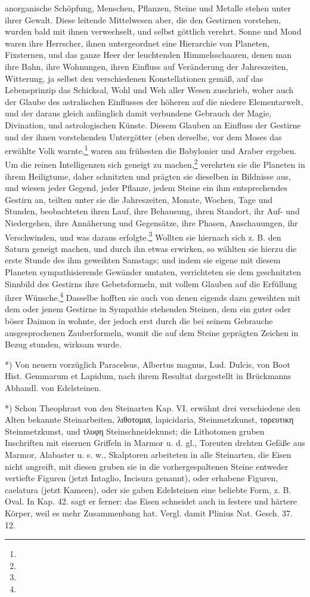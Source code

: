 \documentclass[a4paper, 11pt, oneside, polutonikogreek, german]{article}
\begin{document}
anorganische Schöpfung, Menschen, Pflanzen, Steine und Metalle stehen unter ihrer Gewalt. Diese leitende Mittelwesen aber, die den Gestirnen vorstehen, wurden bald mit ihnen verwechselt, und selbst göttlich verehrt. Sonne und Mond waren ihre Herrscher, ihnen untergeordnet eine Hierarchie von Planeten, Fixsternen, und das ganze Heer der leuchtenden Himmelsschaaren, denen man ihre Bahn, ihre Wohnungen, ihren Einfluss auf Veränderung der Jahreszeiten, Witterung, ja selbst den verschiedenen Konstellationen gemäß, auf das Lebensprinzip das Schicksal, Wohl und Weh aller Wesen zuschrieb, woher auch der Glaube des astralischen Einflusses der höheren auf die niedere Elementarwelt, und der daraus gleich anfänglich damit verbundene Gebrauch der Magie, Divination, und astrologischen Künste. Diesem Glauben an Einfluss der Gestirne und der ihnen vorstehenden Untergötter (eben derselbe, vor dem Moses das erwählte Volk warnte,\footnote{} waren am frühesten die Babylonier und Araber ergeben. Um die reinen Intelligenzen sich geneigt zu machen,\footnote{} verehrten sie die Planeten in ihrem Heiligtume, daher schnitzten und prägten sie dieselben in Bildnisse aus, und wiesen jeder Gegend, jeder Pflanze, jedem Steine ein ihm entsprechendes Gestirn an, teilten unter sie die Jahreszeiten, Monate, Wochen, Tage und Stunden, beobachteten ihren Lauf, ihre Behausung, ihren Standort, ihr Auf- und Niedergehen, ihre Annäherung und Gegensätze, ihre Phasen, Anschauungen, ihr Verschwinden, und was daraus erfolgte.\footnote{} Wollten sie hiernach sich z. B. den Saturn geneigt machen, und durch ihn etwas erwirken, so wählten sie hierzu die erste Stunde des ihm geweihten Samstags; und indem sie eigene mit diesem Planeten sympathisierende Gewänder umtaten, verrichteten sie dem geschnitzten Sinnbild des Gestirns ihre Gebetsformeln, mit vollem Glauben auf die Erfüllung ihrer Wünsche.\footnote{} Dasselbe hofften sie auch von denen eigends dazu geweihten mit dem oder jenem Gestirne in Sympathie stehenden Steinen, dem ein guter oder böser Daimon in wohnte, der jedoch erst durch die bei seinem Gebrauche ausgesprochenen Zauberformeln, womit die auf dem Steine geprägten Zeichen in Bezug stunden, wirksam wurde.

*) Von neuern vorzüglich Paracelsus, Albertus magnus, Lud. Dulcis, von Boot Hist. Gemmarum et Lapidum, nach ihrem Resultat dargestellt in Brückmanns Abhandl. von Edelsteinen.

*) Schon Theophrast von den Steinarten Kap. VI. erwähnt drei verschiedene den Alten bekannte Steinarbeiten, λιθοτομια, lapicidaria, Steinmetzkunst, τορευτικη Steinmetzkunst, und τλυφη Steinschneidekunst; die Lithotomen gruben Inschriften mit eisernen Griffeln in Marmor u. d. gl., Toreuten drehten Gefäße aus Marmor, Alabaster u. s. w., Skalptoren arbeiteten in alle Steinarten, die Eisen nicht angreift, mit diesen gruben sie in die vorhergespaltenen Steine entweder vertiefte Figuren (jetzt Intaglio, Incisura genannt), oder erhabene Figuren, caelatura (jetzt Kameen), oder sie gaben Edelsteinen eine beliebte Form, z. B. Oval. In Kap. 42. sagt er ferner: das Eisen schneidet auch in festere und härtere Körper, weil es mehr Zusammenbang hat. Vergl. damit Plinius Nat. Gesch. 37. 12.
\end{document}
